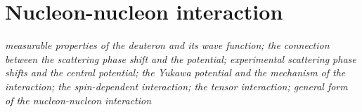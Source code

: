 \section{Nucleon-nucleon interaction}
\begin{center}
\textit{measurable properties of the deuteron and its wave function; the connection between the scattering phase shift and the potential; experimental scattering phase shifts and the central potential; the Yukawa potential and the mechanism of the interaction; the spin-dependent interaction; the tensor interaction; general form of the nucleon-nucleon interaction}
\end{center}